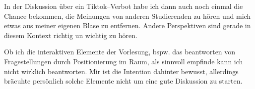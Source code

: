 \documentclass[12pt]{article}
\begin{document}
\vspace{1em}

In der Diskussion über ein Tiktok--Verbot habe ich dann auch noch einmal die Chance bekommen, die Meinungen von anderen Studierenden zu hören und mich etwas aus meiner eigenen Blase zu entfernen. Andere Perspektiven sind gerade in diesem Kontext richtig un wichtig zu hören.

\vspace{1em}

Ob ich die interaktiven Elemente der Vorlesung, bspw. das beantworten von Fragestellungen durch Positionierung im Raum, als sinnvoll empfinde kann ich nicht wirklich beantworten. Mir ist die Intention dahinter bewusst, allerdings bräcuhte persönlich solche Elemente nicht um eine gute Diskussion zu starten.
\end{document}
